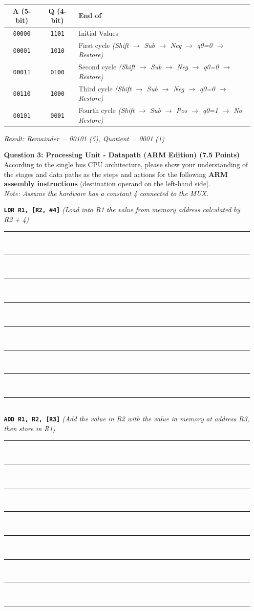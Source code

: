 \documentclass[12pt]{article}
\begin{document}
\vspace{0.5cm}
\begin{center}
\begin{tabular}{|c|c|l|}
\hline
\textbf{A (5-bit)} & \textbf{Q (4-bit)} & \textbf{End of} \\
\hline
\texttt{00000} & \texttt{1101} & Initial Values \\
\hline
\texttt{00001} & \texttt{1010} & First cycle \textit{(Shift $\to$ Sub $\to$ Neg $\to$ q0=0 $\to$ Restore)} \\
\hline
\texttt{00011} & \texttt{0100} & Second cycle \textit{(Shift $\to$ Sub $\to$ Neg $\to$ q0=0 $\to$ Restore)} \\
\hline
\texttt{00110} & \texttt{1000} & Third cycle \textit{(Shift $\to$ Sub $\to$ Neg $\to$ q0=0 $\to$ Restore)} \\
\hline
\texttt{00101} & \texttt{0001} & Fourth cycle \textit{(Shift $\to$ Sub $\to$ Pos $\to$ q0=1 $\to$ No Restore)} \\
\hline
\end{tabular}
\end{center}
\textit{Result: Remainder = 00101 (5), Quotient = 0001 (1)}

\textbf{Question 3: Processing Unit - Datapath (ARM Edition) (7.5 Points)} \\
According to the single bus CPU architecture, please show your understanding of the stages and data paths as the steps and actions for the following \textbf{ARM assembly instructions} (destination operand on the left-hand side). \\
\textit{Note: Assume the hardware has a constant 4 connected to the MUX.}

\textbf{\texttt{LDR R1, [R2, \#4]}} \textit{(Load into R1 the value from memory address calculated by R2 + 4)} \\
\rule{\textwidth}{0.4pt} \\
\rule{\textwidth}{0.4pt} \\
\rule{\textwidth}{0.4pt} \\
\rule{\textwidth}{0.4pt} \\
\rule{\textwidth}{0.4pt} \\
\rule{\textwidth}{0.4pt} \\
\rule{\textwidth}{0.4pt} \\
\rule{\textwidth}{0.4pt} \\

\vspace{1cm}
\textbf{\texttt{ADD R1, R2, [R3]}} \textit{(Add the value in R2 with the value in memory at address R3, then store in R1)} \\
\rule{\textwidth}{0.4pt} \\
\rule{\textwidth}{0.4pt} \\
\rule{\textwidth}{0.4pt} \\
\rule{\textwidth}{0.4pt} \\
\rule{\textwidth}{0.4pt} \\
\rule{\textwidth}{0.4pt} \\
\rule{\textwidth}{0.4pt} \\
\rule{\textwidth}{0.4pt} \\
\end{document}
